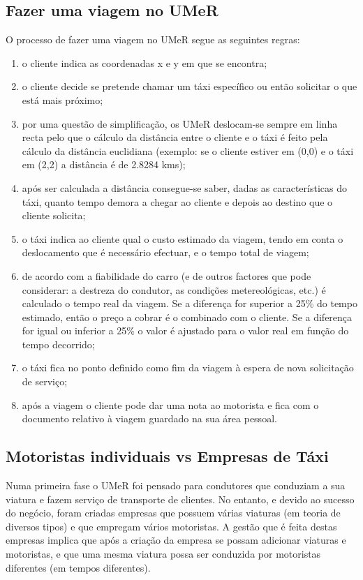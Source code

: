 \subsection{Fazer uma viagem no UMeR}
O processo de fazer uma viagem no UMeR segue as seguintes regras:
\begin{enumerate}
	\item o cliente indica as coordenadas x e y em que se encontra;
	\item o cliente decide se pretende chamar um táxi específico ou então solicitar o que está mais próximo;
	\item por uma questão de simplificação, os UMeR deslocam-se sempre em linha recta pelo que o cálculo da distância entre o cliente e o táxi é feito pela cálculo da distância euclidiana (exemplo: se o cliente estiver em (0,0) e o táxi em (2,2) a distância é de 2.8284 kms);
	\item após ser calculada a distância consegue-se saber, dadas as características do táxi, quanto tempo demora a chegar ao cliente e depois ao destino que o cliente solicita;
	\item o táxi indica ao cliente qual o custo estimado da viagem, tendo em conta o deslocamento que é necessário efectuar, e o tempo total de viagem;
	\item de acordo com a fiabilidade do carro (e de outros factores que pode considerar: a destreza do condutor, as condições metereológicas, etc.) é calculado o tempo real da viagem. Se a diferença for superior a 25\% do tempo estimado, então o preço a cobrar é o combinado com o cliente. Se a diferença for igual ou inferior a 25\% o valor é ajustado para o valor real em função do tempo decorrido;
	\item o táxi fica no ponto definido como fim da viagem à espera de nova solicitação de serviço;
	\item após a viagem o cliente pode dar uma nota ao motorista e fica com o documento relativo à viagem guardado na sua área pessoal.
\end{enumerate}

\subsection{Motoristas individuais vs Empresas de Táxi}
Numa primeira fase o UMeR foi pensado para condutores que conduziam a sua viatura e fazem serviço de transporte de clientes. No entanto, e devido ao sucesso do negócio, foram criadas empresas que possuem várias viaturas (em teoria de diversos tipos) e que empregam vários motoristas. A gestão que é feita destas empresas implica que após a criação da empresa se possam adicionar viaturas e motoristas, e que uma mesma viatura possa ser conduzida por motoristas diferentes (em tempos diferentes).

